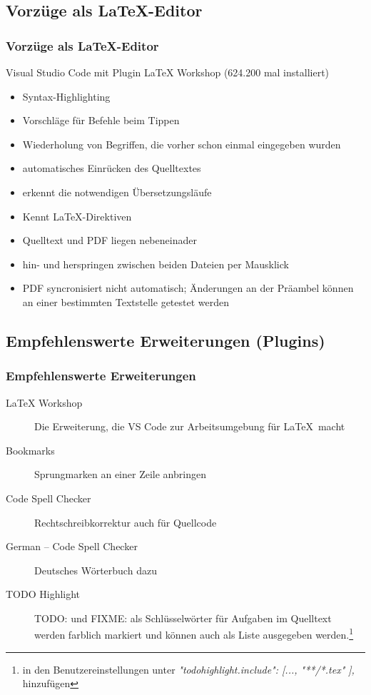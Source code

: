 \documentclass[t, %
							xcolor=dvipsnames,%
							hyperref={bookmarks,colorlinks},%
							]%
							{beamer}
\begin{document}
		\subsection{Vorzüge als \LaTeX-Editor}
		\label{sub:VorzuegeLaTeXEditor}
		\begin{frame}
			\frametitle{Vorzüge als \LaTeX-Editor}
			Visual Studio Code mit Plugin LaTeX Workshop (624.200 mal installiert)
			\begin{itemize}
				\item Syntax-Highlighting
				\item Vorschläge für Befehle beim Tippen
				\item Wiederholung von Begriffen, die vorher schon einmal eingegeben wurden
				\item automatisches Einrücken des Quelltextes
				\item erkennt die notwendigen Übersetzungsläufe
				\item Kennt LaTeX-Direktiven
				\item Quelltext und PDF liegen nebeneinader
				\item hin- und herspringen zwischen beiden Dateien per Mausklick
				\item PDF syncronisiert nicht automatisch; Änderungen an der Präambel können an einer bestimmten Textstelle getestet werden  
			\end{itemize}
		\end{frame}

		\subsection{Empfehlenswerte Erweiterungen (Plugins)}
		\label{sub:EmpfehlenswerteErweiterungen}
		\begin{frame}
			\frametitle{Empfehlenswerte Erweiterungen}
			\begin{description}
				\item[LaTeX Workshop] Die Erweiterung, die VS Code zur Arbeitsumgebung für \LaTeX\ macht
				\item[Bookmarks] Sprungmarken an einer Zeile anbringen
				\item[Code Spell Checker] Rechtschreibkorrektur auch für Quellcode
				\item[German – Code Spell Checker]Deutsches Wörterbuch dazu
				\item[TODO Highlight] TODO: und FIXME: als Schlüsselwörter für Aufgaben im Quelltext werden farblich markiert und können auch als Liste ausgegeben werden.\footnote{in den Benutzereinstellungen unter \emph{"todohighlight.include": [...,					
					"**/*.tex"
			],} hinzufügen}
			\end{description}
		\end{frame}
	
\end{document}
